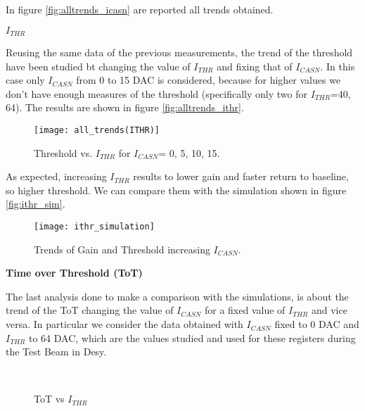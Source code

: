 In figure \vref{fig:alltrends_icasn} are reported all trends obtained.


\begin{description}
\item[\textbf{$I_{THR}$}]
\end{description}

Reusing the same data of the previous measurements, the trend of the threshold have been studied bt changing the value of $I_{THR}$ and fixing that of $I_{CASN}$. In this case only $I_{CASN}$ from 0 to 15 DAC is considered, because for higher values we don't have enough measures of the threshold (specifically only two for $I_{THR}$=40, 64). The results are shown in figure \vref{fig:alltrends_ithr}.

\begin{figure}[h!]
\centering
\texttt{[image: all\_trends(ITHR)]}
\caption{Threshold vs. $I_{THR}$ for $I_{CASN}$= 0, 5, 10, 15.}
\label{fig:alltrends_ithr}
\end{figure}

As expected, increasing $I_{THR}$ results to lower gain and faster return to baseline, so higher threshold. 
We can compare them with the simulation shown in figure \vref{fig:ithr_sim}. 

\begin{figure}[h!]
\centering
\texttt{[image: ithr\_simulation]}
\caption{Trends of Gain and Threshold increasing $I_{CASN}$.}
\label{fig:ithr_sim}
\end{figure}

\begin{description}
\item[\textbf{Time over Threshold (ToT)}]
\end{description}

The last analysis done to make a comparison with the simulations, is about the trend of the ToT changing the value of $I_{CASN}$ for a fixed value of $I_{THR}$ and vice versa. In particular we consider the data obtained with $I_{CASN}$ fixed to 0 DAC and $I_{THR}$ to 64 DAC, which are the values studied and used for these registers during the Test Beam in Desy.

\begin{figure}[h!]
\centering
{}\quad
{}\\
\caption{ToT vs $I_{THR}$}
\label{fig:tot_vs_ithr}
\end{figure}

